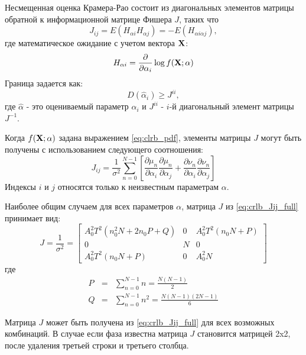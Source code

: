 Несмещенная оценка Крамера-Рао состоит из диагональных элементов матрицы обратной к информационной матрице Фишера ${J}$, таких что
\begin{equation}
	\label{eq:crlb_Jij}
	J_{ij} = E(H_{\alpha i} H_{\alpha j}) = -E(H_{\alpha i \alpha j}),
\end{equation}
где математическое ожидание с учетом вектора ${\bf{X}}$:
\begin{equation}
	\label{eq:crlb_H}
	H_{\alpha i} = \frac{\partial}{\partial \alpha_i} \log{f({\bf{X}}; {\bf{\alpha}})}
\end{equation}
Граница задается как:
\begin{equation}
	\label{eq:crlb_var_alpha}
	D(\hat{\alpha}_i) \ge J^{ii},
\end{equation}
где ${\hat{\alpha}}$ - это оцениваемый параметр ${\alpha_i}$ и ${J^{ii}}$ - ${i}$-й диагональный элемент матрицы ${J^{-1}}$.

Когда ${f({\bf{X}}; {\bf{\alpha}})}$ задана выражением \ref{eq:clrb_pdf}, элементы матрицы ${J}$ могут быть получены с использованием следующего соотношения:
\begin{equation}
	\label{eq:crlb_Jij_full}
	J_{ij} = \frac{1}{\sigma^2} \sum_{n=0}^{N-1} \left[ \frac{\partial \mu_n}{\partial \alpha_i} \frac{\partial \mu_n}{\partial \alpha_j} + \frac{\partial \nu_n}{\partial \alpha_i} \frac{\partial \nu_n}{\partial \alpha_j} \right]
\end{equation}
Индексы ${i}$ и ${j}$ относятся только к неизвестным параметрам ${\alpha}$.

Наиболее общим случаем для всех параметров ${\alpha}$, матрица ${J}$ из \ref{eq:crlb_Jij_full} принимает вид:
\begin{equation}
	\label{eq:lpc_a_estimation}
	J = \frac{1}{\sigma^2} =
		\left[ \begin{array}{ccc}
			A_0^2 T^2 (n_0^2 N + 2n_0P + Q) & 0 & A_0^2 T^2 (n_0 N + P) \\
			0 & N & 0 \\
			A_0^2 T^2 (n_0 N + P) & 0 & A_0^2N
		\end{array} \right]
\end{equation}
где
\begin{eqnarray}
	\label{eq:clrb_QP}
	P & = & \sum_{n=0}^{N-1}n = \frac{N(N-1)}{2} \\
	Q & = & \sum_{n=0}^{N-1}n^2 = \frac{N(N-1)(2N-1)}{6}
\end{eqnarray}

Матрица ${J}$ может быть получена из \ref{eq:crlb_Jij_full} для всех возможных комбинаций. В случае если фаза известна матрица ${J}$ становится матрицей 2x2, после удаления третьей строки
и третьего столбца.

